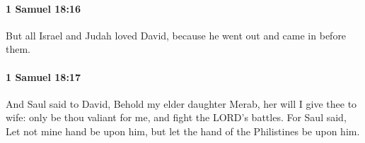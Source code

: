		\paragraph{1 Samuel 18:16} %
			\label{1SAMUEL-18-16}

			But all Israel and Judah loved David, because he went out and came in before them.


		\paragraph{1 Samuel 18:17} %
			\label{1SAMUEL-18-17}

			And Saul said to David, Behold my elder daughter Merab, her will I give thee to wife: only be thou valiant for me, and fight the LORD’s battles. For Saul said, Let not mine hand be upon him, but let the hand of the Philistines be upon him.


